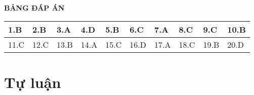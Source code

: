 \whiteBGstarEnd

\loigiai
{
	\begin{center}
		\textbf{BẢNG ĐÁP ÁN}
	\end{center}
	\begin{center}
		\begin{tabular}{|m{2.8em}|m{2.8em}|m{2.8em}|m{2.8em}|m{2.8em}|m{2.8em}|m{2.8em}|m{2.8em}|m{2.8em}|m{2.8em}|}
			\hline
			1.B  & 2.B  & 3.A  & 4.D  & 5.B  & 6.C  & 7.A  & 8.C  & 9.C  & 10.B  \\
			\hline
			11.C  & 12.C  & 13.B  & 14.A  & 15.C  & 16.D  & 17.A  & 18.C  & 19.B  & 20.D  \\
			\hline
			
		\end{tabular}
	\end{center}
}
\section{Tự luận}
